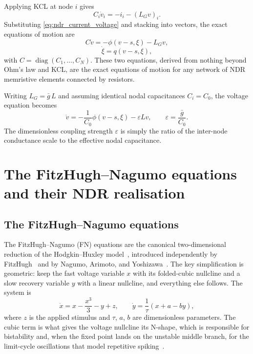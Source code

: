 \documentclass[11pt]{article}
\begin{document}
Applying KCL at node $i$ gives
\begin{equation}
  C_i \dot v_i = -i_i - (L_G v)_i.
  \label{eq:kcl_scalar_laplacian}
\end{equation}
Substituting \eqref{eq:ndr_current_voltage} and stacking into vectors,
the exact equations of motion are
\begin{equation}
  {C\dot v = -\phi(v - s, \xi) - L_G v,}
  \label{eq:full_network_voltage}
\end{equation}
\begin{equation}
  {\dot\xi = q(v - s, \xi),}
  \label{eq:full_network_internal}
\end{equation}
with $C = \operatorname{diag}(C_1,\ldots,C_N)$. These two equations,
derived from nothing beyond Ohm's law and KCL, are the exact equations
of motion for any network of NDR memristive elements connected by
resistors.

Writing $L_G = \bar{g}\,L$ and assuming identical nodal capacitances
$C_i = C_0$, the voltage equation becomes
\begin{equation}
  \dot v = -\frac{1}{C_0}\phi(v - s, \xi) - \varepsilon L v,
  \qquad
  \varepsilon = \frac{\bar{g}}{C_0}.
  \label{eq:normalized_voltage_eps}
\end{equation}
The dimensionless coupling strength $\varepsilon$ is simply the ratio
of the inter-node conductance scale to the effective nodal capacitance.


\section{The FitzHugh--Nagumo equations and their NDR realisation}
\label{sec:fn_equations}


\subsection{The FitzHugh--Nagumo equations}

The FitzHugh--Nagumo (FN) equations are the canonical two-dimensional
reduction of the Hodgkin--Huxley model~\cite{hodgkin1952}, introduced
independently by FitzHugh~\cite{fitzhugh1961} and by Nagumo, Arimoto,
and Yoshizawa~\cite{nagumo1962}. The key simplification is geometric:
keep the fast voltage variable $x$ with its folded-cubic nullcline and a
slow recovery variable $y$ with a linear nullcline, and everything
else follows. The system is
\begin{equation}
  \dot{x} = x - \frac{x^3}{3} - y + z,
  \qquad
  \dot{y} = \frac{1}{\tau}(x + a - by),
  \label{eq:fn_standard}
\end{equation}
where $z$ is the applied stimulus and $\tau$, $a$, $b$ are
dimensionless parameters. The cubic term is what gives the voltage
nullcline its N-shape, which is responsible for bistability and, when
the fixed point lands on the unstable middle branch, for the limit-cycle
oscillations that model repetitive spiking~\cite{izhikevich2007}.
\end{document}
